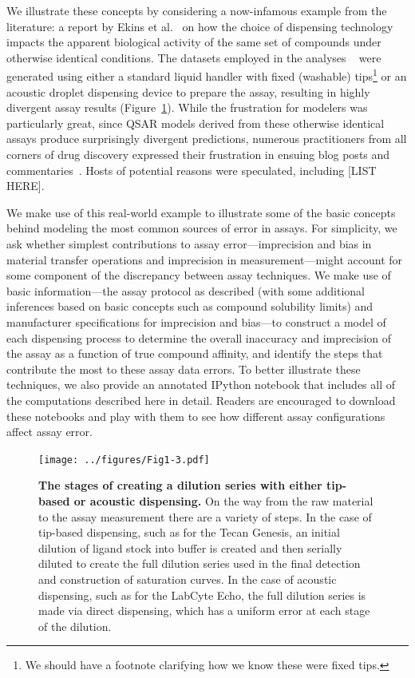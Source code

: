 \documentclass[aps,pre,twocolumn,nofootinbib,superscriptaddress,linenumbers]{revtex4-1}
\begin{document}
We illustrate these concepts by considering a now-infamous example from the literature: a report by Ekins et al.~\cite{ekins_dispensing_2013} on how the choice of dispensing technology impacts the apparent biological activity of the same set of compounds under otherwise identical conditions.
The datasets employed in the analyses ~\cite{barlaam_novel_2009,barlaam_pyrimidine_2010} were generated using either a standard liquid handler with fixed (washable) tips\footnote{{\color{red}We should have a footnote clarifying how we know these were fixed tips.}} or an acoustic droplet dispensing device to prepare the assay, resulting in highly divergent assay results (Figure~\ref{fig:overview}).
While the frustration for modelers was particularly great, since QSAR models derived from these otherwise identical assays produce surprisingly divergent predictions, numerous practitioners from all corners of drug discovery expressed their frustration in ensuing blog posts and commentaries~\cite{lowe_drug_2015,evanko_serial_2013,ekins_what_2013}.
Hosts of potential reasons were speculated, including {\color{red}[LIST HERE]}.

\color{blue}
We make use of this real-world example to illustrate some of the basic concepts behind modeling the most common sources of error in assays.
For simplicity, we ask whether simplest contributions to assay error---imprecision and bias in material transfer operations and imprecision in measurement---might account for some component of the discrepancy between assay techniques.
We make use of basic information---the assay protocol as described (with some additional inferences based on basic concepts such as compound solubility limits) and manufacturer specifications for imprecision and bias---to construct a model of each dispensing process to determine the overall inaccuracy and imprecision of the assay as a function of true compound affinity, and identify the steps that contribute the most to these assay data errors.
\color{black}
To better illustrate these techniques, we also provide an annotated IPython notebook that includes all of the computations described here in detail.
Readers are encouraged to download these notebooks and play with them to see how different assay configurations affect assay error.

\begin{figure}[tb]
   \texttt{[image: ../figures/Fig1-3.pdf]}
  \caption{{\bf The stages of creating a dilution series with either tip-based or acoustic dispensing.}
  On the way from the raw material to the assay measurement there are a variety of steps. 
  In the case of tip-based dispensing, such as for the Tecan Genesis, an initial dilution of ligand stock into buffer is created and then serially diluted to create the full dilution series used in the final detection and construction of saturation curves. 
  In the case of acoustic dispensing, such as for the LabCyte Echo, the full dilution series is made via direct dispensing, which has a uniform error at each stage of the dilution.
  }
  \label{fig:overview}
\end{figure}
\end{document}
